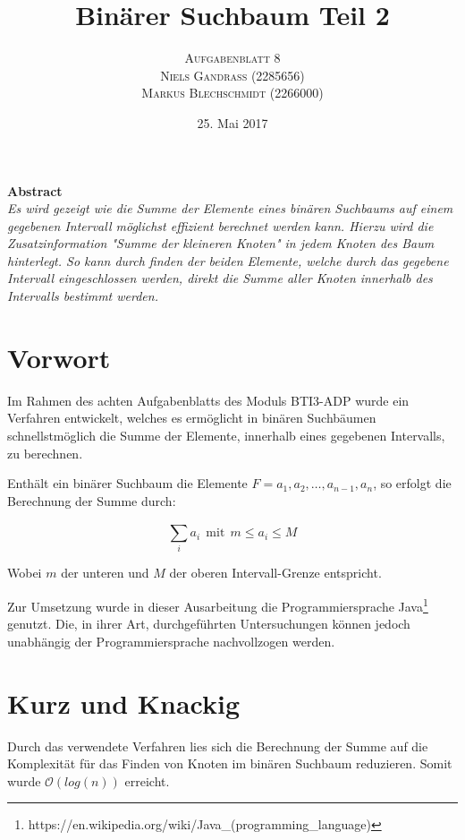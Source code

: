 \documentclass[paper=a4, fontsize=12pt]{article}
\title{\vspace{-15mm}\fontsize{24pt}{10pt}\selectfont\textbf{Binärer Suchbaum Teil 2}} %
\author{
\large
{\textsc{Aufgabenblatt 8}}\\[2mm]
{\textsc{Niels Gandraß (2285656)}}\\[2mm]
{\textsc{Markus Blechschmidt (2266000)}}\\[2mm]
}
\date{25. Mai 2017} %
\begin{document}
\maketitle %
\thispagestyle{fancy} %


\begin{center}
	\textbf{Abstract}\\
	\textit{Es wird gezeigt wie die Summe der Elemente eines binären Suchbaums auf einem gegebenen Intervall möglichst effizient berechnet werden kann. Hierzu wird die Zusatzinformation "Summe der kleineren Knoten" in jedem Knoten des Baum hinterlegt. So kann durch finden der beiden Elemente, welche durch das gegebene Intervall eingeschlossen werden, direkt die Summe aller Knoten innerhalb des Intervalls bestimmt werden.}
\end{center}


\section{Vorwort}
Im Rahmen des achten Aufgabenblatts des Moduls BTI3-ADP wurde ein Verfahren entwickelt, welches es ermöglicht in binären Suchbäumen schnellstmöglich die Summe der Elemente, innerhalb eines gegebenen Intervalls, zu berechnen.

\begin{center}
	Enthält ein binärer Suchbaum die Elemente $F = a_1, a_2, \ldots, a_{n-1}, a_{n}$, so erfolgt die Berechnung der Summe durch:
\end{center}
$$ \sum_{i}^{} a_i ~~\text{mit}~~ m \leq a_i \leq M $$
\begin{center}
	Wobei $m$ der unteren und $M$ der oberen Intervall-Grenze entspricht.
\end{center}

\vspace{6pt}
Zur Umsetzung wurde in dieser Ausarbeitung die Programmiersprache Java\footnote{https://en.wikipedia.org/wiki/Java\_(programming\_language)} genutzt. Die, in ihrer Art, durchgeführten Untersuchungen können jedoch unabhängig der Programmiersprache nachvollzogen werden.

\section{Kurz und Knackig}
Durch das verwendete Verfahren lies sich die Berechnung der Summe auf die Komplexität für das Finden von Knoten im binären Suchbaum reduzieren. Somit wurde $\mathcal{O}(log(n))$ erreicht.
\end{document}
